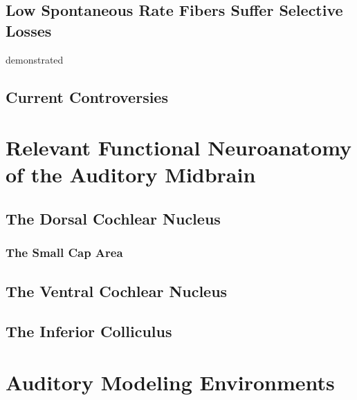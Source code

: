 \subsection{Low Spontaneous Rate Fibers Suffer Selective Losses} %
\label{sub:low_spontaneous_rate_fibers_suffer_selective_losses}
\cite{Furman2013NoiseInduced} demonstrated 

\subsection{Current Controversies} %
\label{sub:current_controversies}

\section{Relevant Functional Neuroanatomy of the Auditory Midbrain} %
\label{sec:relevant_functional_neuroanatomy_of_the_auditory_midbrain}
\subsection{The Dorsal Cochlear Nucleus} %
\label{sub:the_dorsal_cochlear_nucleus}
\subsubsection{The Small Cap Area} %
\label{ssub:the_small_cap_area}

\subsection{The Ventral Cochlear Nucleus} %
\label{sub:the_ventral_cochlear_nucleus}

\subsection{The Inferior Colliculus} %
\label{sub:the_inferior_colliculus}


\section{Auditory Modeling Environments} %
\label{sec:auditory_modeling_environments}
